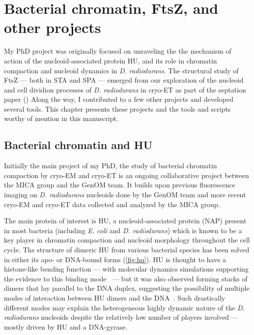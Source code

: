 \chapter{Bacterial chromatin, FtsZ, and other projects}\label{other_projects}

My PhD project was originally focused on unraveling the the mechanism of action of the nucleoid-associated protein HU, and its role in chromatin compaction and nucleoid dynamics in \textit{D. radiodurans}.
The structural study of FtsZ --- both in STA and SPA --- emerged from our exploration of the nucleoid and cell dividion processes of \textit{D. radiodurans} in cryo-ET as part of the septation paper ()
Along the way, I contributed to a few other projects and developed several tools.
This chapter presents these projects and the tools and scripts worthy of mention in this manuscript.

\localtableofcontents

\section{Bacterial chromatin and HU}\label{hu}

Initially the main project of my PhD, the study of bacterial chromatin compaction by cryo-EM and cryo-ET is an ongoing collaborative project between the MICA group and the GenOM team.
It builds upon previous fluorescence imaging on \textit{D. radiodurans} nucleoids done by the GenOM team and more recent cryo-EM and cryo-ET data collected and analyzed by the MICA group.

The main protein of interest is HU, a nucleoid-associated protein (NAP) present in most bacteria (including \textit{E. coli} and \textit{D. radiodurans}) which is known to be a key player in chromatin compaction and nucleoid morphology throughout the cell cycle.
The structure of dimeric HU from various bacterial species has been solved in either its apo- or DNA-bound forms (\autoref{fig:hu}).
HU is thought to have a histone-like bending function --- with molecular dynamics simulations supporting the evidence to this binding mode~\cite{hognonMolecularBasesDNA2019} --- but it was also observed forming stacks of dimers that lay parallel to the DNA duplex, suggesting the possibility of multiple modes of interaction between HU dimers and the DNA~\cite{hammelHUMultimerizationShift2016}.
Such drastically different modes may explain the heterogeneous highly dynamic nature of the \textit{D. radiodurans} nucleoids despite the relatively low number of players involved --- mostly driven by HU and a DNA-gyrase.

